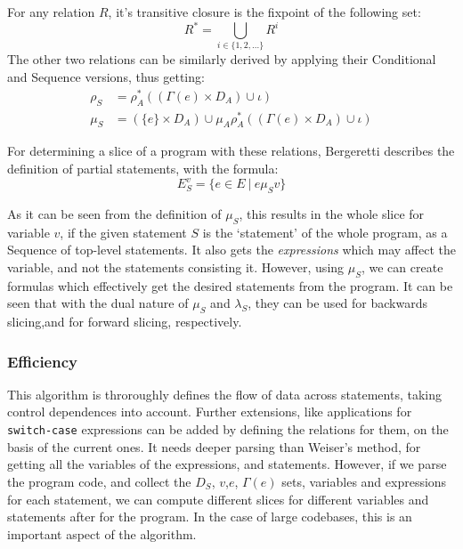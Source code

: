 \documentclass[oneside,12pt,a4paper]{book}
\begin{document}
For any relation $R$, it's transitive closure is the fixpoint of the following set:
\begin{equation}
R^* = \bigcup_{i \in \{1,2,...\}} R^i
\end{equation}
The other two relations can be similarly derived by applying their Conditional and Sequence versions, thus getting:
\begin{equation}
\begin{split}
\rho_S &= \rho^*_A((\Gamma(e) \times D_A) \cup \iota) \\
\mu_S &= (\{e\} \times D_A) \cup \mu_A\rho^*_A((\Gamma(e) \times D_A) \cup \iota)
\end{split}
\end{equation}

For determining a slice of a program with these relations, Bergeretti describes the definition of partial statements, with the formula:
\begin{equation}
E^v_S = \{e \in E\ |\ e \mu_S v\}
\end{equation}

As it can be seen from the definition of $\mu_S$, this results in the whole slice for variable $v$, if the given statement $S$ is the `statement' of the whole program, as a Sequence of top-level statements. It also gets the \textit{expressions} which may affect the variable, and not the statements consisting it. However, using $\mu_S$, we can create formulas which effectively get the desired statements from the program. It can be seen that with the dual nature of $\mu_S$ and $\lambda_S$, they can be used for backwards slicing,and for forward slicing, respectively. 

\subsubsection{Efficiency}

This algorithm is throroughly defines the flow of data across statements, taking control dependences into account. Further extensions, like applications for \texttt{switch-case} expressions can be added by defining the relations for them, on the basis of the current ones. It needs deeper parsing than Weiser's method, for getting all the variables of the expressions, and statements. However, if we parse the program code, and collect the $D_S$, $v$,$e$, $\Gamma(e)$ sets, variables and expressions for each statement, we can compute different slices for different variables and statements after for the program. In the case of large codebases, this is an important aspect of the algorithm. 
\end{document}
